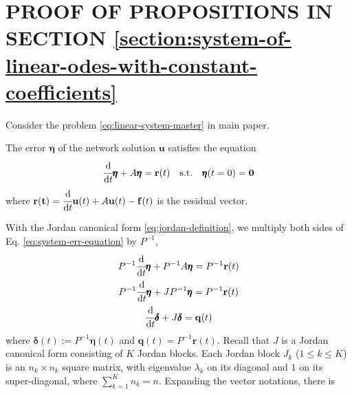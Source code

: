 \documentclass[accepted]{uai2023}
\newcommand{\vect}[1]{\mathbf{#1}}
\newcommand{\dt}[1]{\cfrac{\mathrm{d} #1}{\mathrm{d} t}}
\newcommand{\Err}{\eta}
\begin{document}
\section{PROOF OF PROPOSITIONS IN SECTION \ref{section:system-of-linear-odes-with-constant-coefficients}}
    Consider the problem \ref{eq:linear-system-master} in main paper. 

    The error $\pmb{\Err}$ of the network solution $\vect{u}$ satisfies the equation
    \begin{equation}\label{eq:system-err-equation}
        \dt{} \pmb{\Err} + A\pmb{\Err} = \vect{r}(t) \quad \text{s.t.} \quad \pmb{\Err}(t=0) = \vect{0}
    \end{equation}
    where $\vect{r(t)} = \dt{}\vect{u}(t) + A\vect{u}(t) - \vect{f}(t)$ is the residual vector.

    With the Jordan canonical form \ref{eq:jordan-definition}, we multiply both sides of Eq. \ref{eq:system-err-equation} by $P^{-1}$,
    \begin{gather}
        P^{-1}\dt{}\pmb{\Err} + P^{-1}A \pmb{\Err} = P^{-1}\vect{r}(t) \\
        P^{-1}\dt{}\pmb{\Err} + JP^{-1} \pmb{\Err} = P^{-1}\vect{r}(t) \\
        \dt{}\pmb{\delta} + J \pmb{\delta}  = \vect{q}(t) 
    \end{gather}
    where $\pmb{\delta}(t) := P^{-1}\pmb{\Err}(t)$ and $\vect{q}(t) = P^{-1}\vect{r}(t)$. Recall that $J$ is a Jordan canonical form consisting of $K$ Jordan blocks. Each Jordan block $J_k$ ($1\leq k \leq K$) is an $n_k \times n_k$ square matrix, with eigenvalue $\lambda_k$ on its diagonal and $1$ on its super-diagonal, where $\sum_{k=1}^{K} n_k = n$. Expanding the vector notations, there is 
    \begingroup
        \newcommand{\?}[1]{\multicolumn{1}{c|}{#1}}
\end{document}
